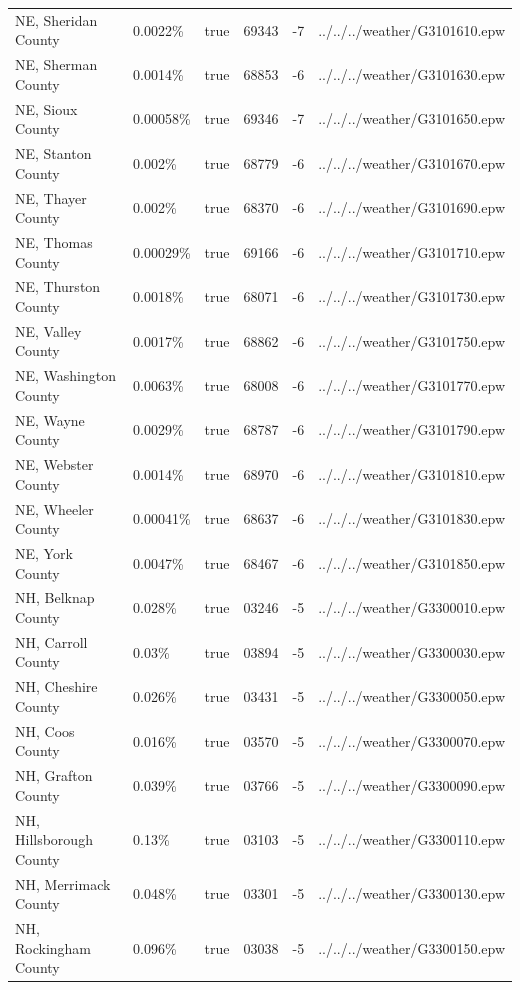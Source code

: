 \begin{longtable}[]{@{}llllll@{}}
NE, Sheridan County & 0.0022\% & true & 69343 & -7 &
../../../weather/G3101610.epw \\
NE, Sherman County & 0.0014\% & true & 68853 & -6 &
../../../weather/G3101630.epw \\
NE, Sioux County & 0.00058\% & true & 69346 & -7 &
../../../weather/G3101650.epw \\
NE, Stanton County & 0.002\% & true & 68779 & -6 &
../../../weather/G3101670.epw \\
NE, Thayer County & 0.002\% & true & 68370 & -6 &
../../../weather/G3101690.epw \\
NE, Thomas County & 0.00029\% & true & 69166 & -6 &
../../../weather/G3101710.epw \\
NE, Thurston County & 0.0018\% & true & 68071 & -6 &
../../../weather/G3101730.epw \\
NE, Valley County & 0.0017\% & true & 68862 & -6 &
../../../weather/G3101750.epw \\
NE, Washington County & 0.0063\% & true & 68008 & -6 &
../../../weather/G3101770.epw \\
NE, Wayne County & 0.0029\% & true & 68787 & -6 &
../../../weather/G3101790.epw \\
NE, Webster County & 0.0014\% & true & 68970 & -6 &
../../../weather/G3101810.epw \\
NE, Wheeler County & 0.00041\% & true & 68637 & -6 &
../../../weather/G3101830.epw \\
NE, York County & 0.0047\% & true & 68467 & -6 &
../../../weather/G3101850.epw \\
NH, Belknap County & 0.028\% & true & 03246 & -5 &
../../../weather/G3300010.epw \\
NH, Carroll County & 0.03\% & true & 03894 & -5 &
../../../weather/G3300030.epw \\
NH, Cheshire County & 0.026\% & true & 03431 & -5 &
../../../weather/G3300050.epw \\
NH, Coos County & 0.016\% & true & 03570 & -5 &
../../../weather/G3300070.epw \\
NH, Grafton County & 0.039\% & true & 03766 & -5 &
../../../weather/G3300090.epw \\
NH, Hillsborough County & 0.13\% & true & 03103 & -5 &
../../../weather/G3300110.epw \\
NH, Merrimack County & 0.048\% & true & 03301 & -5 &
../../../weather/G3300130.epw \\
NH, Rockingham County & 0.096\% & true & 03038 & -5 &
../../../weather/G3300150.epw \\

\end{longtable}

